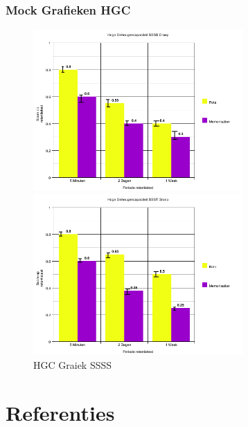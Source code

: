 \documentclass[12pt,a4paper]{article}
\begin{document}
    	\subsubsection{Mock Grafieken HGC} 
    	\begin{figure}[h]
    		\includegraphics[width=8cm]{grafiek1}
    		\caption{HGC Graiek SSSS}
    		\includegraphics[width=8cm]{grafiek3}
    	\end{figure}

    \newpage
    \section{Referenties}
    
	\printbibliography
    
\end{document}
